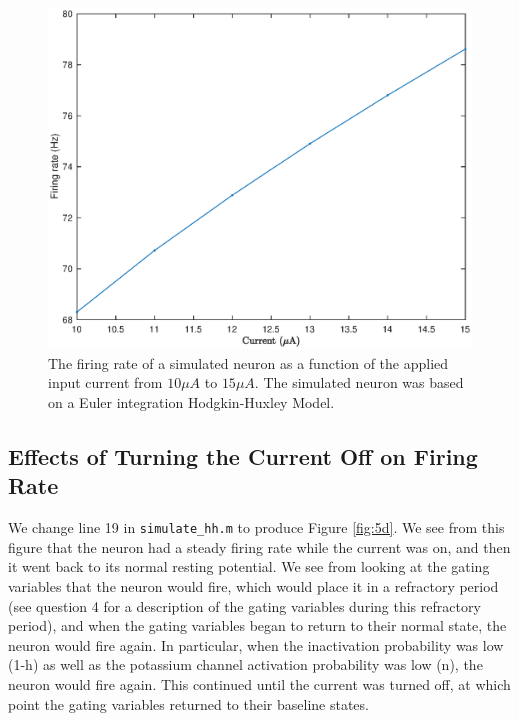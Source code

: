 \documentclass[11pt, oneside]{article}
\begin{document}
\begin{figure}[ht!]
\centering
\includegraphics[width=1\textwidth]{5c.eps}
\caption{The firing rate of a simulated neuron as a function of the applied input current from $10\mu A$ to $15\mu A$. The simulated neuron was based on a Euler integration Hodgkin-Huxley Model.}
\label{fig:5c}
\end{figure}

\subsection{Effects of Turning the Current Off on Firing Rate}

We change line 19 in \lstinline{simulate_hh.m} to produce Figure \ref{fig:5d}. We see from this figure that the neuron had a steady firing rate while the current was on, and then it went back to its normal resting potential. We see from looking at the gating variables that the neuron would fire, which would place it in a refractory period (see question 4 for a description of the gating variables during this refractory period), and when the gating variables began to return to their normal state, the neuron would fire again. In particular, when the inactivation probability was low (1-h) as well as the potassium channel activation probability was low (n), the neuron would fire again. This continued until the current was turned off, at which point the gating variables returned to their baseline states.
\end{document}
